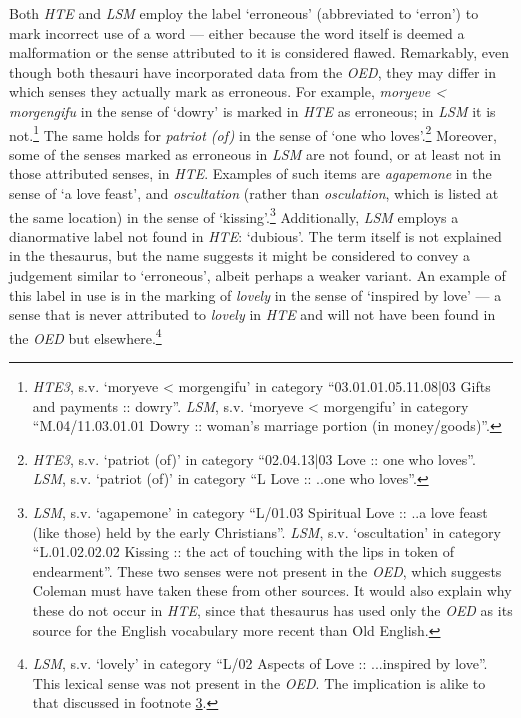 Both \textit{HTE} and \textit{LSM} employ the label `erroneous' (abbreviated to `erron') to mark incorrect use of a word --- either because the word itself is deemed a malformation or the sense attributed to it is considered flawed. Remarkably, even though both thesauri have incorporated data from the \textit{OED}, they may differ in which senses they actually mark as erroneous. For example, \textit{moryeve < morgengifu} in the sense of `dowry' is marked in \textit{HTE} as erroneous; in \textit{LSM} it is not.\footnote{\textit{HTE3}, s.v. `moryeve < morgengifu' in category ``03.01.01.05.11.08|03 Gifts and payments :: dowry''. \textit{LSM}, s.v. `moryeve < morgengifu' in category ``M.04/11.03.01.01 Dowry :: woman's marriage portion (in money/goods)''.} The same holds for \textit{patriot (of)} in the sense of `one who loves'.\footnote{\textit{HTE3}, s.v. `patriot (of)' in category ``02.04.13|03 Love :: one who loves''. \textit{LSM}, s.v. `patriot (of)' in category ``L Love :: ..one who loves''.} Moreover, some of the senses marked as erroneous in \textit{LSM} are not found, or at least not in those attributed senses, in \textit{HTE}. Examples of such items are \textit{agapemone} in the sense of `a love feast', and \textit{oscultation} (rather than \textit{osculation}, which is listed at the same location) in the sense of `kissing'.\footnote{\label{note:Appendix1.B:LSM-markings-erroneous}\textit{LSM}, s.v. `agapemone' in category ``L/01.03 Spiritual Love :: ..a love feast (like those) held by the early Christians''. \textit{LSM}, s.v. `oscultation' in category ``L.01.02.02.02 Kissing :: the act of touching with the lips in token of endearment''. These two senses were not present in the \textit{OED}, which suggests Coleman must have taken these from other sources. It would also explain why these do not occur in \textit{HTE}, since that thesaurus has used only the \textit{OED} as its source for the English vocabulary more recent than Old English.} Additionally, \textit{LSM} employs a dianormative label not found in \textit{HTE}: `dubious'. The term itself is not explained in the thesaurus, but the name suggests it might be considered to convey a judgement similar to `erroneous', albeit perhaps a weaker variant. An example of this label in use is in the marking of \textit{lovely} in the sense of `inspired by love' --- a sense that is never attributed to \textit{lovely} in \textit{HTE} and will not have been found in the \textit{OED} but elsewhere.\footnote{\textit{LSM}, s.v. `lovely' in category ``L/02 Aspects of Love :: ...inspired by love''. This lexical sense was not present in the \textit{OED}. The implication is alike to that discussed in footnote \ref{note:Appendix1.B:LSM-markings-erroneous}.}

